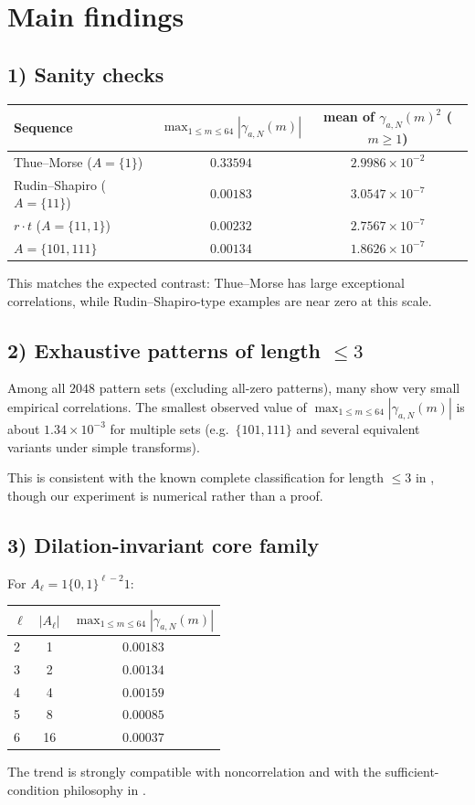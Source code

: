 \documentclass[11pt]{article}
\begin{document}
\section{Main findings}
\subsection*{1) Sanity checks}
\begin{center}
\begin{tabular}{lcc}
\toprule
Sequence & $\max_{1\le m\le 64}|\gamma_{a,N}(m)|$ & mean of $\gamma_{a,N}(m)^2$ ($m\ge 1$) \\
\midrule
Thue--Morse ($A=\{1\}$) & $0.33594$ & $2.9986\times 10^{-2}$ \\
Rudin--Shapiro ($A=\{11\}$) & $0.00183$ & $3.0547\times 10^{-7}$ \\
$r\cdot t$ ($A=\{11,1\}$) & $0.00232$ & $2.7567\times 10^{-7}$ \\
$A=\{101,111\}$ & $0.00134$ & $1.8626\times 10^{-7}$ \\
\bottomrule
\end{tabular}
\end{center}

This matches the expected contrast: Thue--Morse has large exceptional correlations, while Rudin--Shapiro-type examples are near zero at this scale.

\subsection*{2) Exhaustive patterns of length $\le 3$}
Among all $2048$ pattern sets (excluding all-zero patterns), many show very small empirical correlations. The smallest observed value of $\max_{1\le m\le 64}|\gamma_{a,N}(m)|$ is about $1.34\times10^{-3}$ for multiple sets (e.g.\ $\{101,111\}$ and several equivalent variants under simple transforms).

This is consistent with the known complete classification for length $\le 3$ in \cite{ZPK18}, though our experiment is numerical rather than a proof.

\subsection*{3) Dilation-invariant core family}
For $A_\ell=1\{0,1\}^{\ell-2}1$:
\begin{center}
\begin{tabular}{lcc}
\toprule
$\ell$ & $|A_\ell|$ & $\max_{1\le m\le 64}|\gamma_{a,N}(m)|$ \\
\midrule
2 & 1 & $0.00183$ \\
3 & 2 & $0.00134$ \\
4 & 4 & $0.00159$ \\
5 & 8 & $0.00085$ \\
6 & 16 & $0.00037$ \\
\bottomrule
\end{tabular}
\end{center}
The trend is strongly compatible with noncorrelation and with the sufficient-condition philosophy in \cite{Kon21,ZPK18}.
\end{document}
